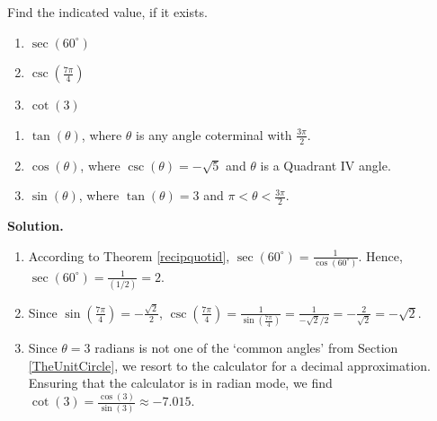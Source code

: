 \begin{ex} \label{circularfunctionsex}  Find the indicated value, if it exists.

\begin{multicols}{3}

\begin{enumerate}

\item  $\sec\left(60^{\circ}\right)$

\item  $\csc\left(\frac{7 \pi}{4} \right)$

\item  $\cot(3)$

\setcounter{HW}{\value{enumi}}

\end{enumerate}

\end{multicols}

\begin{enumerate}

\setcounter{enumi}{\value{HW}}

\item $\tan\left(\theta\right)$, where $\theta$ is any angle coterminal with $\frac{3\pi}{2}$.

\item $\cos\left(\theta\right)$, where $\csc(\theta) = -\sqrt{5}$ and $\theta$ is a Quadrant IV angle.

\item $\sin\left(\theta\right)$, where $\tan(\theta) = 3$ and $\pi < \theta < \frac{3\pi}{2}$.

\end{enumerate}

{\bf Solution.}  

\begin{enumerate}

\item  According to Theorem \ref{recipquotid},   $\sec\left(60^{\circ}\right) = \frac{1}{\cos\left(60^{\circ}\right)}$. Hence,  $\sec\left(60^{\circ}\right) = \frac{1}{(1/2)} = 2$.

\item  Since $\sin\left( \frac{7\pi}{4}\right) = - \frac{\sqrt{2}}{2}$,  $\csc\left( \frac{7\pi}{4}\right) = \frac{1}{\sin\left( \frac{7\pi}{4}\right)} = \frac{1}{- \sqrt{2}/2} = - \frac{2}{\sqrt{2}} = - \sqrt{2}$.

\item  Since $\theta = 3$ radians is not one of the `common angles' from Section \ref{TheUnitCircle}, we resort to the calculator for a decimal approximation.  Ensuring that the calculator is in radian mode, we find $\cot(3) = \frac{\cos(3)}{\sin(3)} \approx -7.015$.


\end{enumerate}
\end{ex}
